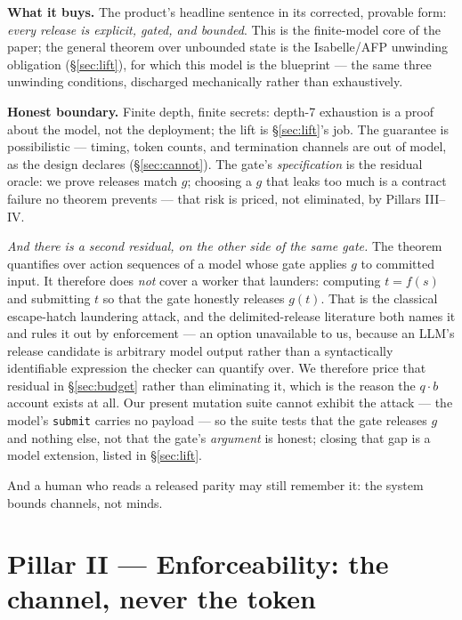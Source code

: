 \documentclass[11pt,a4paper]{article}
\begin{document}
\textbf{What it buys.} The product's headline sentence in its corrected, provable form: \emph{every release is explicit, gated,
and bounded}. This is the finite-model core of the paper; the general theorem over unbounded state is the Isabelle/AFP unwinding
obligation (\S\ref{sec:lift}), for which this model is the blueprint --- the same three unwinding conditions, discharged
mechanically rather than exhaustively.

\begin{boundary}
\textbf{Honest boundary.} Finite depth, finite secrets: depth-7 exhaustion is a proof about the model, not the deployment; the
lift is \S\ref{sec:lift}'s job. The guarantee is possibilistic --- timing, token counts, and termination channels are out of
model, as the design declares (\S\ref{sec:cannot}). The gate's \emph{specification} is the residual oracle: we prove releases
match $g$; choosing a $g$ that leaks too much is a contract failure no theorem prevents --- that risk is priced, not eliminated,
by Pillars III--IV.

\emph{And there is a second residual, on the other side of the same gate.} The theorem quantifies over action sequences of a
model whose gate applies $g$ to committed input. It therefore does \emph{not} cover a worker that launders: computing
$t=f(s)$ and submitting $t$ so that the gate honestly releases $g(t)$. That is the classical escape-hatch laundering attack,
and the delimited-release literature both names it and rules it out by enforcement \cite{sm03} --- an option unavailable to us,
because an LLM's release candidate is arbitrary model output rather than a syntactically identifiable expression the checker can
quantify over. We therefore price that residual in \S\ref{sec:budget} rather than eliminating it, which is the reason the
$q\cdot b$ account exists at all. Our present mutation suite cannot exhibit the attack --- the model's \texttt{submit} carries no
payload --- so the suite tests that the gate releases $g$ and nothing else, not that the gate's \emph{argument} is honest; closing
that gap is a model extension, listed in \S\ref{sec:lift}.

And a human who reads a released parity may still remember it: the system bounds channels, not minds.
\end{boundary}



\section{Pillar II --- Enforceability: the channel, never the token}\label{sec:p2}
\end{document}
